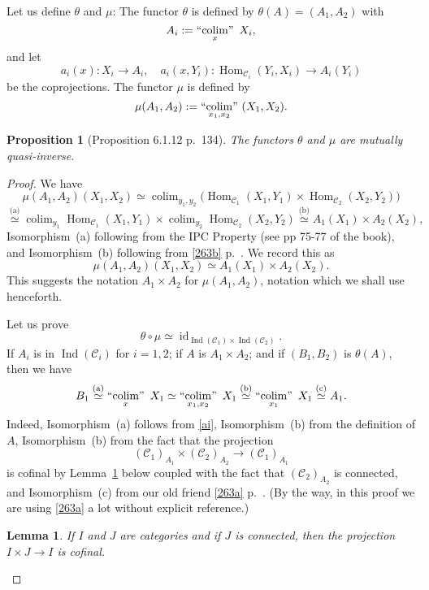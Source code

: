 \documentclass[12pt]{article}
\newtheorem{lem}[thm]{Lemma}
\newtheorem{prop}[thm]{Proposition}
\theoremstyle{remark}
\theoremstyle{definition}
\newcommand{\C}{\mathcal C}
\DeclareMathOperator*{\colim}{colim}
\DeclareMathOperator*{\ic}{``\!\colim\!"}
\DeclareMathOperator{\id}{id}
\DeclareMathOperator{\Hom}{Hom}
\DeclareMathOperator{\Ind}{Ind}
\begin{document}
Let us define $\theta$ and $\mu$: The functor $\theta$ is defined by $\theta(A)=(A_1,A_2)$ with
%
\begin{equation}\label{ai}
A_i:=\ic_x\ X_i, 
\end{equation}
% 
and let 
%
\begin{equation}\label{dot}
a_i(x):X_i\to A_i,\quad a_i(x,Y_i):\Hom_{\C_i}(Y_i,X_i)\to A_i(Y_i)
\end{equation}
% 
be the coprojections. The functor $\mu$ is defined by 
$$
\mu(A_1,A_2):=\ic_{x_1,x_2}\ (X_1,X_2). 
$$ 

\begin{prop}[Proposition 6.1.12 p.~134]\label{p6112}
The functors $\theta$ and $\mu$ are mutually quasi-inverse.
\end{prop}

\begin{proof}
We have 
$$
\mu(A_1,A_2)(X_1,X_2)\simeq\colim_{y_1,y_2}\Big(\Hom_{\C_1}(X_1,Y_1)\times\Hom_{\C_2}(X_2,Y_2)\Big)
$$
$$
\overset{\text{(a)}}{\simeq}\colim_{y_1}\Hom_{\C_1}(X_1,Y_1)\times\colim_{y_2}\Hom_{\C_2}(X_2,Y_2)
\overset{\text{(b)}}{\simeq}A_1(X_1)\times A_2(X_2),
$$ 
Isomorphism~(a) following from the IPC Property (see pp 75-77 of the book), and Isomorphism~(b) following from \eqref{263b} p.~\pageref{263b}. We record this as
$$
\mu(A_1,A_2)(X_1,X_2)\simeq A_1(X_1)\times A_2(X_2).
$$
This suggests the notation $A_1\times A_2$ for $\mu(A_1,A_2)$, notation which we shall use henceforth.

Let us prove
%
\begin{equation}\label{6112a}
\theta\circ\mu\simeq\id_{\Ind(\C_1)\times\Ind(\C_2)}.
\end{equation}
%
If $A_i$ is in $\Ind(\C_i)$ for $i=1,2$; if $A$ is $A_1\times A_2$; and if $(B_1,B_2)$ is $\theta(A)$, then we have 
$$ 
B_1
\overset{\text{(a)}}{\simeq}\ic_x\ X_1\simeq\ic_{x_1,x_2}\ X_1
\overset{\text{(b)}}{\simeq}\ic_{x_1}\ X_1
\overset{\text{(c)}}{\simeq}A_1.
$$ 
Indeed, Isomorphism~(a) follows from \eqref{ai}, Isomorphism~(b) from the definition of $A$, Isomorphism~(b) from the fact that the projection 
$$
(\C_1)_{A_1}\times(\C_2)_{A_2}\to(\C_1)_{A_1}
$$ 
is cofinal by Lemma~\ref{proj} below coupled with the fact that $(\C_2)_{A_2}$ is connected, and Isomorphism~(c) from our old friend \eqref{263a} p.~\pageref{263a}. (By the way, in this proof we are using \eqref{263a} a lot without explicit reference.)

\begin{lem}\label{proj}
If $I$ and $J$ are categories and if $J$ is connected, then the projection $I\times J\to I$ is cofinal.
\end{lem}


\end{proof}
\end{document}
